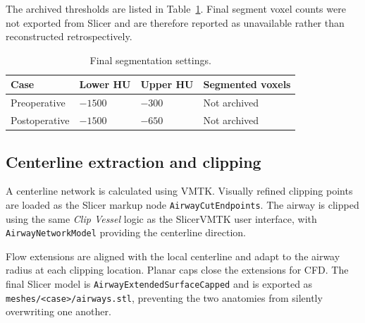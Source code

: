 \documentclass[11pt,a4paper]{article}
\begin{document}
The archived thresholds are listed in Table~\ref{tab:segmentation}. Final
segment voxel counts were not exported from Slicer and are therefore reported
as unavailable rather than reconstructed retrospectively.

\begin{table}[htbp]
  \centering
  \caption{Final segmentation settings.}
  \label{tab:segmentation}
  \begin{tabular}{@{}llll@{}}
    \toprule
    Case & Lower HU & Upper HU & Segmented voxels \\
    \midrule
    Preoperative  & $-1500$ & $-300$ & Not archived \\
    Postoperative & $-1500$ & $-650$ & Not archived \\
    \bottomrule
  \end{tabular}
\end{table}

\subsection{Centerline extraction and clipping}

A centerline network is calculated using VMTK. Visually refined clipping points
are loaded as the Slicer markup node \texttt{AirwayCutEndpoints}. The airway is
clipped using the same \textit{Clip Vessel} logic as the SlicerVMTK user
interface, with \texttt{AirwayNetworkModel} providing the centerline direction.

Flow extensions are aligned with the local centerline and adapt to the airway
radius at each clipping location. Planar caps close the extensions for CFD. The
final Slicer model is \texttt{AirwayExtendedSurfaceCapped} and is exported as
\texttt{meshes/<case>/airways.stl}, preventing the two anatomies from
silently overwriting one another.
\end{document}

